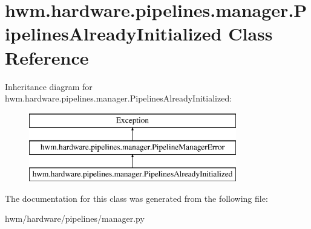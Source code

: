 \hypertarget{classhwm_1_1hardware_1_1pipelines_1_1manager_1_1_pipelines_already_initialized}{\section{hwm.\-hardware.\-pipelines.\-manager.\-Pipelines\-Already\-Initialized Class Reference}
\label{classhwm_1_1hardware_1_1pipelines_1_1manager_1_1_pipelines_already_initialized}
}
Inheritance diagram for hwm.\-hardware.\-pipelines.\-manager.\-Pipelines\-Already\-Initialized\-:\begin{figure}[H]
\begin{center}
\leavevmode
\includegraphics[height=3.000000cm]{classhwm_1_1hardware_1_1pipelines_1_1manager_1_1_pipelines_already_initialized}
\end{center}
\end{figure}


The documentation for this class was generated from the following file\-:\begin{DoxyCompactItemize}
\item 
hwm/hardware/pipelines/manager.\-py\end{DoxyCompactItemize}
